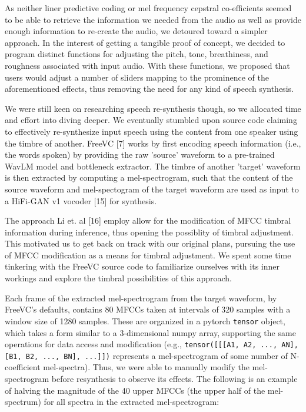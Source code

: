 \documentclass{article}
\begin{document}
As neither liner predictive coding or mel frequency cepstral co-efficients seemed to be able to retrieve the information we needed from the audio as well as provide enough information to re-create the audio, we detoured toward a simpler approach. In the interest of getting a tangible proof of concept, we decided to program distinct functions for adjusting the pitch, tone, breathiness, and roughness associated with input audio. With these functions, we proposed that users would adjust a number of sliders mapping to the prominence of the aforementioned effects, thus removing the need for any kind of speech synthesis.

We were still keen on researching speech re-synthesis though, so we allocated time and effort into diving deeper. We eventually stumbled upon source code claiming to effectively re-synthesize input speech using the content from one speaker using the timbre of another. FreeVC [7] works by first encoding speech information (i.e., the words spoken) by providing the raw 'source' waveform to a pre-trained WavLM model and bottleneck extractor. The timbre of another 'target' waveform is then extracted by computing a mel-spectrogram, such that the content of the source waveform and mel-spectogram of the target waveform are used as input to a HiFi-GAN v1 vocoder [15] for synthesis.

The approach Li et. al [16] employ allow for the modification of MFCC timbral information during inference, thus opening the possiblity of timbral adjustment. This motivated us to get back on track with our original plans, pursuing the use of MFCC modification as a means for timbral adjustment. We spent some time tinkering with the FreeVC source code to familiarize ourselves with its inner workings and explore the timbral possibilities of this approach.

Each frame of the extracted mel-spectrogram from the target waveform, by FreeVC's defaults, contains 80 MFCCs taken at intervals of 320 samples with a window size of 1280 samples. These are organized in a pytorch \texttt{tensor} object, which takes a form similar to a 3-dimensional numpy array, supporting the same operations for data access and modification (e.g., \texttt{tensor([[[A1, A2, ..., AN], [B1, B2, ..., BN], ...]])} represents a mel-spectrogram of some number of N-coefficient mel-spectra). Thus, we were able to manually modify the mel-spectrogram before resynthesis to observe its effects. The following is an example of halving the magnitude of the 40 upper MFCCs (the upper half of the mel-spectrum) for all spectra in the extracted mel-spectrogram:
\end{document}
